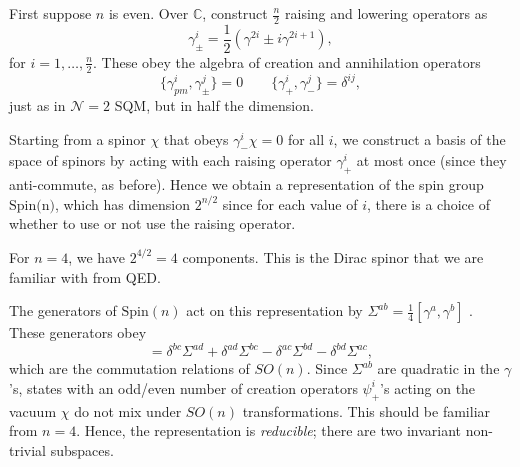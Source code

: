 First suppose $n$ is even. Over $\mathbb{C}$, construct $\frac{n}{2}$ raising and lowering operators as
\begin{equation}
  \gamma^{i}_{\pm} = \frac{1}{2} \left( \gamma^{2i} \pm i \gamma^{2i + 1} \right),
\end{equation}
for $i = 1, \dots, \frac{n}{2}$.
These obey the algebra of creation and annihilation operators
\begin{equation}
  \{ \gamma^i_{pm}, \gamma^j_{\pm} \} = 0 \qquad \{\gamma^i_+, \gamma^j_-\} = \delta^{ij},
\end{equation}
just as in $\mathcal{N} = 2$ SQM, but in half the dimension.

Starting from a spinor $\chi$ that obeys $\gamma^{i}_- \chi = 0$  for all $i$, we construct a basis of the space of spinors by acting with each raising operator  $\gamma^{i}_+$  at most once (since they anti-commute, as before).
Hence we obtain a representation of the spin group $\text{Spin(n)}$, which has dimension $2^{n / 2}$ since for each value of $i$, there is a choice of whether to use or not use the raising operator.
\begin{example}[]
  For $n = 4$, we have $2^{4 / 2} = 4 $ components. This is the Dirac spinor that we are familiar with from QED.
\end{example}

The generators of $\text{Spin}(n)$  act on this representation by $\Sigma^{ab} = \frac{1}{4} [\gamma^a, \gamma^b]$ .
These generators obey
\begin{equation}
  [\Sigma^{ab}, \Sigma^{cd}] = \delta^{bc} \Sigma^{ad} + \delta^{ad} \Sigma^{bc} - \delta^{ac} \Sigma^{bd} - \delta^{bd} \Sigma^{ac},
\end{equation}
which are the commutation relations of $SO(n)$.
Since $\Sigma^{ab}$ are quadratic in the $\gamma$'s, states with an odd/even number of creation operators $\psi^{i}_+$'s acting on the vacuum $\chi$ do not mix under $SO(n)$ transformations. This should be familiar from $n = 4$.
Hence, the representation is \emph{reducible}; there are two invariant non-trivial subspaces.

